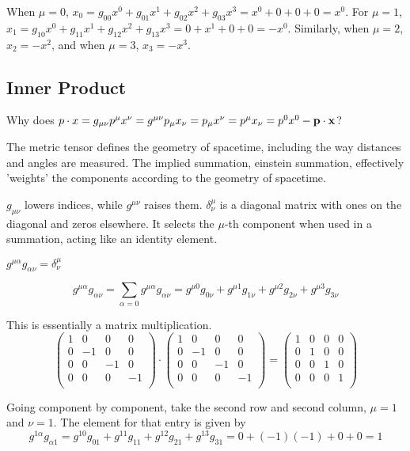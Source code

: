 When $\mu = 0$, $x_0 = g_{00}x^0 + g_{01}x^1 + g_{02}x^2 + g_{03}x^3 = x^0 + 0 + 0 +0 = x^0$.
For $\mu = 1$, $x_1 = g_{10}x^0 + g_{11}x^1 + g_{12}x^2 + g_{13}x^3 = 0 + x^1 + 0 +0 = -x^0$.
Similarly, when $\mu = 2$, $x_2 = -x^2$, and when $\mu =3$, $x_3 = -x^3$.


\subsection{Inner Product}

Why does $p \cdot x = g_{\mu\nu} p^\mu x^\nu = g^{\mu\nu} p_\mu x_\nu = p_\mu x^\nu = p^\mu x_\nu = p^0 x^0 - \boldsymbol{\mathbf{p}}\cdot\boldsymbol{\mathbf{x}}$?

The metric tensor defines the geometry of spacetime, including the way distances and angles are measured.
The implied summation, einstein summation, effectively 'weights' the components according to the geometry of spacetime.

$g_{\mu\nu}$ lowers indices, while $g^{\mu\nu}$ raises them.
$\delta^{\mu}_{\nu}$ is a diagonal matrix with ones on the diagonal and zeros elsewhere.
It selects the $\mu$-th component when used in a summation, acting like an identity element.

$g^{\mu\alpha} g_{\alpha\nu} = \delta^{\mu}_{\nu}$

$$
g^{\mu\alpha} g_{\alpha\nu} = \sum_{\alpha = 0} g^{\mu\alpha} g_{\alpha\nu} =
g^{\mu 0} g_{0 \nu} + g^{\mu 1} g_{1\nu} + g^{\mu 2} g_{2\nu} + g^{\mu 3} g_{3\nu}
$$

This is essentially a matrix multiplication.
$$
\begin{pmatrix}
    1 & 0  & 0  & 0  \\
    0 & -1 & 0  & 0  \\
    0 & 0  & -1 & 0  \\
    0 & 0  & 0  & -1 \\
\end{pmatrix}
\cdot
\begin{pmatrix}
    1 & 0  & 0  & 0  \\
    0 & -1 & 0  & 0  \\
    0 & 0  & -1 & 0  \\
    0 & 0  & 0  & -1 \\
\end{pmatrix}
=
\begin{pmatrix}
    1 & 0 & 0 & 0 \\
    0 & 1 & 0 & 0 \\
    0 & 0 & 1 & 0 \\
    0 & 0 & 0 & 1 \\
\end{pmatrix}
$$

Going component by component, take the second row and second column, $\mu=1$ and $\nu=1$.
The element for that entry is given by
$$
g^{1\alpha}g_{\alpha 1} =
g^{1 0} g_{0 1} + g^{1 1} g_{1 1} + g^{1 2} g_{2 1} + g^{1 3} g_{3 1}
= 0 + (-1)(-1) + 0 + 0 = 1
$$